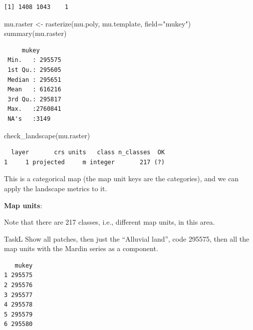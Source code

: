 \documentclass[
  letterpaper,
  DIV=11,
  numbers=noendperiod]{scrartcl}
\newenvironment{Shaded}{\begin{snugshade}}{\end{snugshade}}
\newcommand{\AttributeTok}[1]{\textcolor[rgb]{0.40,0.45,0.13}{#1}}
\newcommand{\FunctionTok}[1]{\textcolor[rgb]{0.28,0.35,0.67}{#1}}
\newcommand{\NormalTok}[1]{\textcolor[rgb]{0.00,0.23,0.31}{#1}}
\newcommand{\OtherTok}[1]{\textcolor[rgb]{0.00,0.23,0.31}{#1}}
\newcommand{\SpecialCharTok}[1]{\textcolor[rgb]{0.37,0.37,0.37}{#1}}
\newcommand{\StringTok}[1]{\textcolor[rgb]{0.13,0.47,0.30}{#1}}
\begin{document}
\begin{verbatim}
[1] 1408 1043    1
\end{verbatim}

\begin{Shaded}
\begin{Highlighting}[]
\NormalTok{mu.raster }\OtherTok{\textless{}{-}} \FunctionTok{rasterize}\NormalTok{(mu.poly, mu.template, }\AttributeTok{field=}\StringTok{"mukey"}\NormalTok{)}
\FunctionTok{summary}\NormalTok{(mu.raster)}
\end{Highlighting}
\end{Shaded}

\begin{verbatim}
     mukey        
 Min.   : 295575  
 1st Qu.: 295605  
 Median : 295651  
 Mean   : 616216  
 3rd Qu.: 295817  
 Max.   :2760841  
 NA's   :3149     
\end{verbatim}

\begin{Shaded}
\begin{Highlighting}[]
\FunctionTok{check\_landscape}\NormalTok{(mu.raster)}
\end{Highlighting}
\end{Shaded}

\begin{verbatim}
  layer       crs units   class n_classes  OK
1     1 projected     m integer       217 (?)
\end{verbatim}

This is a categorical map (the map unit keys are the categories), and we
can apply the landscape metrics to it.

\textbf{Map units}:

Note that there are 217 classes, i.e., different map units, in this
area.

TaskL Show all patches, then just the ``Alluvial land'', code 295575,
then all the map units with the Mardin series as a component.

\begin{Shaded}
\end{Shaded}

\begin{verbatim}
   mukey
1 295575
2 295576
3 295577
4 295578
5 295579
6 295580
\end{verbatim}
\end{document}
